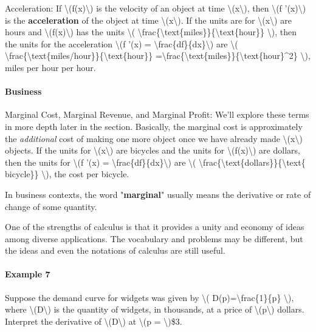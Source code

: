 Acceleration: If \textbackslash{}(f(x)\textbackslash{}) is the velocity
of an object at time \textbackslash{}(x\textbackslash{}), then
\textbackslash{}(f '(x)\textbackslash{}) is the \textbf{acceleration} of
the object at time \textbackslash{}(x\textbackslash{}). If the units are
for \textbackslash{}(x\textbackslash{}) are hours and
\textbackslash{}(f(x)\textbackslash{}) has the units \textbackslash{}(
\textbackslash{}frac\{\textbackslash{}text\{miles\}\}\{\textbackslash{}text\{hour\}\}
\textbackslash{}), then the units for the acceleration
\textbackslash{}(f '(x) =
\textbackslash{}frac\{df\}\{dx\}\textbackslash{}) are \textbackslash{}(
\textbackslash{}frac\{\textbackslash{}text\{miles/hour\}\}\{\textbackslash{}text\{hour\}\}
=\textbackslash{}frac\{\textbackslash{}text\{miles\}\}\{\textbackslash{}text\{hour\}\^{}2\}
\textbackslash{}), miles per hour per hour.

\hypertarget{business}{%
\paragraph{Business}\label{business}}

Marginal Cost, Marginal Revenue, and Marginal Profit: We'll explore
these terms in more depth later in the section. Basically, the marginal
cost is approximately the \emph{additional} cost of making one more
object once we have already made \textbackslash{}(x\textbackslash{})
objects. If the units for \textbackslash{}(x\textbackslash{}) are
bicycles and the units for \textbackslash{}(f(x)\textbackslash{}) are
dollars, then the units for \textbackslash{}(f '(x) =
\textbackslash{}frac\{df\}\{dx\}\textbackslash{}) are \textbackslash{}(
\textbackslash{}frac\{\textbackslash{}text\{dollars\}\}\{\textbackslash{}text\{
bicycle\}\} \textbackslash{}), the cost per bicycle.

In business contexts, the word "\textbf{marginal}" usually means the
derivative or rate of change of some quantity.

One of the strengths of calculus is that it provides a unity and economy
of ideas among diverse applications. The vocabulary and problems may be
different, but the ideas and even the notations of calculus are still
useful.

\hypertarget{example-7}{%
\paragraph{Example 7}\label{example-7}}

Suppose the demand curve for widgets was given by \textbackslash{}(
D(p)=\textbackslash{}frac\{1\}\{p\} \textbackslash{}), where
\textbackslash{}(D\textbackslash{}) is the quantity of widgets, in
thousands, at a price of \textbackslash{}(p\textbackslash{}) dollars.
Interpret the derivative of \textbackslash{}(D\textbackslash{}) at
\textbackslash{}(p = \textbackslash{})\$3.

